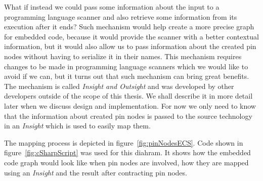 \par
What if instead we could pass some information about the input to a programming language scanner and also retrieve some information from its execution after it ends? Such mechanism would help create a more precise graph for embedded code, because it would provide the scanner with a better contextual information, but it would also allow us to pass information about the created pin nodes without having to serialize it in their names. This mechanism requires changes to be made in programming language scanners which we would like to avoid if we can, but it turns out that such mechanism can bring great benefits. The mechanism is called \textit{Insight and Outsight} and was developed by other developers outside of the scope of this thesis. We shall describe it in more detail later when we discuss design and implementation. For now we only need to know that the information about created pin nodes is passed to the source technology in an \textit{Insight} which is used to easily map them.
\par
The mapping process is depicted in figure~\ref{fig:pinNodesECS}. Code shown in figure~\ref{fig:cSharpScript} was used for this diahram. It shows how the embedded code graph would look like when pin nodes are involved, how they are mapped using an \textit{Insight} and the result after contracting pin nodes.

